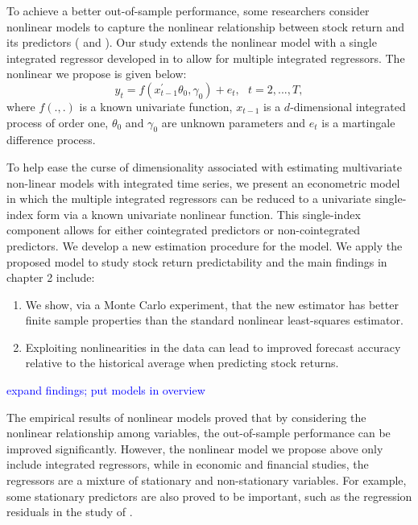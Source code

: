 \documentclass[a4paper,12pt,times,numbered,print,index]{report}
\numberwithin{equation}{section}
\begin{document}
To achieve a better out-of-sample performance, some researchers consider nonlinear models to capture the nonlinear relationship between stock return and its predictors (\cite{park2001nonlinear} and \cite{park2002nonstationary}). Our study extends the nonlinear model with a single integrated regressor developed in \cite{park2001nonlinear} to allow for multiple integrated regressors. The nonlinear we propose is given below:
\begin{equation}
y_{t}=f\left( x_{t-1}^{\prime }\theta _{0},\gamma _{0}\right) +e_{t},\ \ \
t=2,...,T, 
\label{NL_model}
\end{equation}
where $f\left( .,.\right) $ is a known univariate function, $x_{t-1}$ is a $d$-dimensional integrated process of order one, $\theta _{0}$ and $\gamma _{0}$ are unknown parameters and $e_{t}$ is a martingale difference process.

To help ease the curse of dimensionality associated
with estimating multivariate non-linear models with integrated time series, we present an econometric model in which the multiple integrated regressors can be reduced to a univariate single-index form via a known univariate nonlinear function. This single-index component allows for either cointegrated predictors or non-cointegrated predictors. We develop a new estimation procedure for the model. We apply the proposed model to study stock return predictability and the main findings in chapter 2 include:
\begin{enumerate}
	\item We show, via a Monte Carlo experiment, that the new estimator has
	better finite sample properties than the standard nonlinear least-squares
	estimator. 
	\item Exploiting nonlinearities in the data can lead to improved forecast accuracy relative to the historical average when predicting stock returns. 
\end{enumerate}

\textcolor{blue}{expand findings; put models in overview}

The empirical results of nonlinear models proved that by considering the nonlinear relationship among variables, the out-of-sample performance can be improved significantly. However, the nonlinear model we propose above only include integrated regressors,  while in economic and financial
studies, the regressors are a mixture of stationary and non-stationary variables. For example,  some stationary predictors are also proved to be important, such as the regression residuals in the study of \cite{lettau2001consumption}. 
\end{document}
